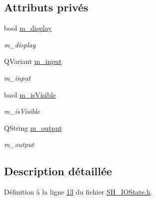 \subsection*{Attributs privés}
\begin{DoxyCompactItemize}
\item 
bool \hyperlink{classSimpleHotel_1_1SH__InOutState_a219039bbe5e46a91dfd7aa51fb530ae4}{m\-\_\-display}
\begin{DoxyCompactList}\small\item\em m\-\_\-display \end{DoxyCompactList}\item 
Q\-Variant \hyperlink{classSimpleHotel_1_1SH__InOutState_a7d352dcee656801359ae973726fabc4f}{m\-\_\-input}
\begin{DoxyCompactList}\small\item\em m\-\_\-input \end{DoxyCompactList}\item 
bool \hyperlink{classSimpleHotel_1_1SH__InOutState_a041ad53f3cdfb1b18ee002597e833848}{m\-\_\-is\-Visible}
\begin{DoxyCompactList}\small\item\em m\-\_\-is\-Visible \end{DoxyCompactList}\item 
Q\-String \hyperlink{classSimpleHotel_1_1SH__InOutState_ab3dc360d32c8da2b958f8cdda90a8518}{m\-\_\-output}
\begin{DoxyCompactList}\small\item\em m\-\_\-output \end{DoxyCompactList}\end{DoxyCompactItemize}


\subsection{Description détaillée}


Définition à la ligne \hyperlink{SH__IOState_8h_source_l00013}{13} du fichier \hyperlink{SH__IOState_8h_source}{S\-H\-\_\-\-I\-O\-State.\-h}.



